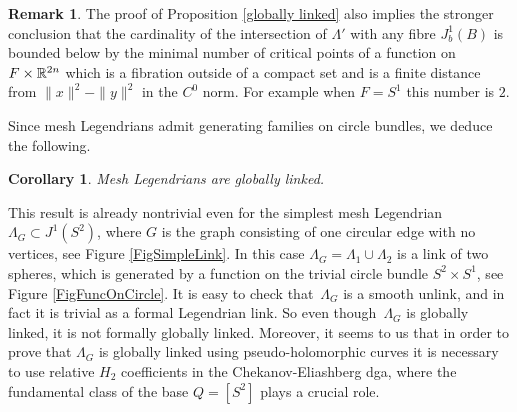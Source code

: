\documentclass[11pt]{article}
\numberwithin{equation}{section}\providecommand{\dpl}{\displaystyle}
\theoremstyle{plain}
\newtheorem{corollary}[theorem]{Corollary}
\theoremstyle{definition}
\newtheorem{remark}[theorem]{Remark}
\begin{document}
\begin{remark}
The proof of Proposition \ref{globally linked} also implies the stronger conclusion that the cardinality of the intersection of $\Lambda'$ with any fibre $J^1_b(B)$ is bounded below by the minimal number of critical points of a function on $F \times \mathbb{R}^{2n}$ which is a fibration outside of a compact set and is a finite distance from $\|x\|^2-\|y\|^2$ in the $C^0$ norm. For example when $F=S^1$ this number is $2$.
\end{remark}

Since mesh Legendrians admit generating families on circle bundles, we deduce the following.

\begin{corollary}\label{corollary: mesh Legendrians are globally linked}
Mesh Legendrians are globally linked.
\end{corollary}

This result is already nontrivial even for the simplest mesh Legendrian $\Lambda_G \subset J^1(S^2)$, where $G$ is the graph consisting of one circular edge with no vertices, see Figure \ref{FigSimpleLink}. In this case $\Lambda_G= \Lambda_1 \cup \Lambda_2$ is a link of two spheres, which is generated by a function on the trivial circle bundle $S^2 \times S^1$, see Figure \ref{FigFuncOnCircle}. It is easy to check that~$\Lambda_G$ is a smooth unlink, and in fact it is trivial as a formal Legendrian link. So even though~$\Lambda_G$ is globally linked, it is not formally globally linked. Moreover, it seems to us that in order to prove that $\Lambda_G$ is globally linked using pseudo-holomorphic curves it is necessary to use relative $H_2$ coefficients in the Chekanov-Eliashberg dga, where the fundamental class of the base $Q=[S^2]$ plays a crucial role.
\end{document}
